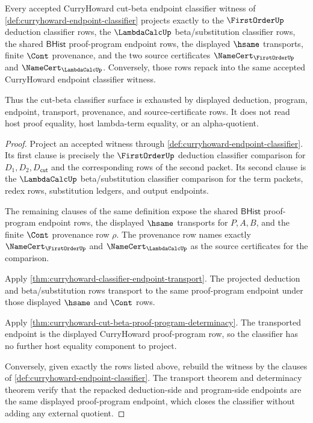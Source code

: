 \begin{theorem}\label{thm:curryhoward-cut-beta-classifier-exhaustion}
Every accepted CurryHoward cut-beta endpoint classifier witness of
\autoref{def:curryhoward-endpoint-classifier} projects exactly to the
$\FirstOrderUp$ deduction classifier rows, the $\LambdaCalcUp$ beta/substitution
classifier rows, the shared $\mathsf{BHist}$ proof-program endpoint rows, the
displayed $\hsame$ transports, finite $\Cont$ provenance, and the two source
certificates $\NameCert_{\FirstOrderUp}$ and $\NameCert_{\LambdaCalcUp}$.
Conversely, those rows repack into the same accepted CurryHoward endpoint
classifier witness.

Thus the cut-beta classifier surface is exhausted by displayed deduction,
program, endpoint, transport, provenance, and source-certificate rows. It does
not read host proof equality, host lambda-term equality, or an alpha-quotient.
\end{theorem}
\begin{proof}
Project an accepted witness through
\autoref{def:curryhoward-endpoint-classifier}. Its first clause is precisely the
$\FirstOrderUp$ deduction classifier comparison for $D_1,D_2,D_{\mathsf{cut}}$
and the corresponding rows of the second packet. Its second clause is the
$\LambdaCalcUp$ beta/substitution classifier comparison for the term packets,
redex rows, substitution ledgers, and output endpoints.

The remaining clauses of the same definition expose the shared
$\mathsf{BHist}$ proof-program endpoint rows, the displayed $\hsame$ transports
for $P,A,B$, and the finite $\Cont$ provenance row $\rho$. The provenance row
names exactly $\NameCert_{\FirstOrderUp}$ and $\NameCert_{\LambdaCalcUp}$ as the
source certificates for the comparison.

Apply \autoref{thm:curryhoward-classifier-endpoint-transport}. The projected
deduction and beta/substitution rows transport to the same proof-program
endpoint under those displayed $\hsame$ and $\Cont$ rows.

Apply \autoref{thm:curryhoward-cut-beta-proof-program-determinacy}. The
transported endpoint is the displayed CurryHoward proof-program row, so the
classifier has no further host equality component to project.

Conversely, given exactly the rows listed above, rebuild the witness by the
clauses of \autoref{def:curryhoward-endpoint-classifier}. The transport theorem
and determinacy theorem verify that the repacked deduction-side and
program-side endpoints are the same displayed proof-program endpoint, which
closes the classifier without adding any external quotient.
\end{proof}

